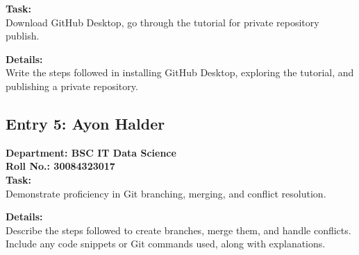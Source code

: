 \documentclass[a4paper,12pt]{article}
\begin{document}
\textbf{Task:} \\
Download GitHub Desktop, go through the tutorial for private repository publish.

\textbf{Details:} \\
Write the steps followed in installing GitHub Desktop, exploring the tutorial, and publishing a private repository.

\subsection{Entry 5: Ayon Halder}
\textbf{Department: BSC IT Data Science} \\
\textbf{Roll No.: 30084323017} \\

\textbf{Task:} \\
Demonstrate proficiency in Git branching, merging, and conflict resolution.

\textbf{Details:} \\
Describe the steps followed to create branches, merge them, and handle conflicts. Include any code snippets or Git commands used, along with explanations.
\end{document}
